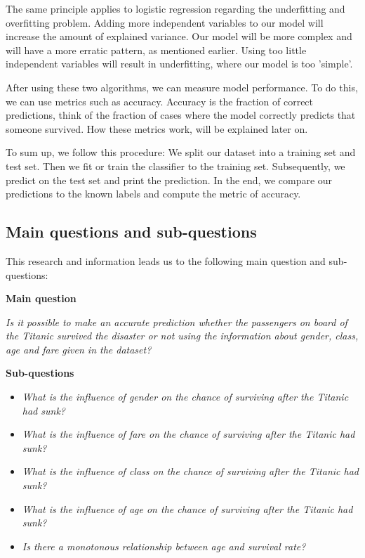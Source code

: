 \documentclass[11pt]{article}
\begin{document}
The same principle applies to logistic regression regarding the underfitting and overfitting problem. Adding more independent variables to our model will increase the amount of explained variance. Our model will be more complex and will have a more erratic pattern, as mentioned earlier. Using too little independent variables will result in underfitting, where our model is too 'simple'. 

After using these two algorithms, we can measure model performance. To do this, we can use metrics such as accuracy. Accuracy is the fraction of correct predictions, think of the fraction of cases where the model correctly predicts that someone survived. How these metrics work, will be explained later on. 

To sum up, we follow this procedure: We split our dataset into a training set and test set. Then we fit or train the classifier to the training set. Subsequently, we predict on the test set and print the prediction. In the end, we compare our predictions to the known labels and compute the metric of accuracy. 

\newpage

\subsection{Main questions and sub-questions}
\label{sec:org8395708}
This research and information leads us to the following main question and sub-questions: 

\textbf{Main question}

\emph{Is it possible to make an accurate prediction whether the passengers on board of the Titanic survived the disaster or not using the information about gender, class, age and fare given in the dataset?}

\textbf{Sub-questions} 

\begin{itemize}
\item \emph{What is the influence of gender on the chance of surviving after the Titanic had sunk?}
\item \emph{What is the influence of fare on the chance of surviving after the Titanic had sunk?}
\item \emph{What is the influence of class on the chance of surviving after the Titanic had sunk?}
\item \emph{What is the influence of age on the chance of surviving after the Titanic had sunk?}
\item \emph{Is there a monotonous relationship between age and survival rate?}
\end{itemize}
\end{document}

